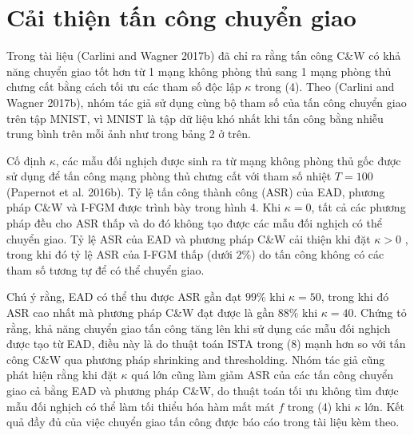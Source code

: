 \section{Cải thiện tấn công chuyển giao}
Trong tài liệu (Carlini and Wagner 2017b) đã chỉ ra rằng tấn công C\&W có khả năng chuyển giao tốt hơn  từ 1 mạng không phòng thủ sang 1 mạng phòng thủ chưng cất bằng cách tối ưu các tham số độc lập $\kappa$ trong (4). Theo (Carlini and Wagner 2017b), nhóm tác giả sử dụng cùng bộ tham số của tấn công chuyển giao trên tập MNIST, vì MNIST là tập dữ liệu khó nhất khi tấn công bằng nhiễu trung bình trên mỗi ảnh như trong bảng 2 ở trên.

Cố định $\kappa$, các mẫu đối nghịch được sinh ra từ mạng không phòng thủ gốc được sử dụng để tấn công mạng phòng thủ chưng cất với tham số nhiệt $T = 100$ (Papernot et al. 2016b). Tỷ lệ tấn công thành công (ASR) của EAD, phương pháp C\&W và I-FGM được trình bày trong hình 4. Khi $\kappa = 0$, tất cả các phương pháp đều cho ASR thấp và do đó không tạo được các mẫu đối nghịch có thể chuyển giao. Tỷ lệ ASR của EAD và phương pháp C\&W cải thiện khi đặt $\kappa > 0$ , trong khi đó tỷ lệ ASR của I-FGM thấp (dưới $2\%$) do tấn công không có các tham số tương tự để có thể chuyển giao.

Chú ý rằng, EAD có thể thu được ASR gần đạt $99\%$ khi $\kappa = 50$, trong khi đó ASR cao nhất mà phương pháp C\&W đạt được là gần $88\%$ khi $\kappa = 40$. Chứng tỏ rằng, khả năng chuyển giao tấn công tăng lên khi sử dụng các mẫu đối nghịch được tạo từ EAD, điều này là do thuật toán ISTA trong (8) mạnh hơn so với tấn công C\&W qua phương pháp shrinking and thresholding. Nhóm tác giả cũng phát hiện rằng khi đặt $\kappa$ quá lớn cũng làm giảm ASR của các tấn công chuyển giao cả bằng EAD và phương pháp C\&W, do thuật toán tối ưu không tìm được mẫu đối nghịch có thể làm tối thiểu hóa hàm mất mát $f$ trong (4) khi $\kappa$ lớn. Kết quả đầy đủ của việc chuyển giao tấn công được báo cáo trong tài liệu kèm theo.